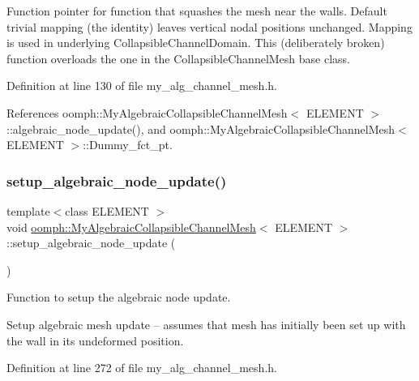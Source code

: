 Function pointer for function that squashes the mesh near the walls. Default trivial mapping (the identity) leaves vertical nodal positions unchanged. Mapping is used in underlying Collapsible\+Channel\+Domain. This (deliberately broken) function overloads the one in the Collapsible\+Channel\+Mesh base class. 



Definition at line 130 of file my\+\_\+alg\+\_\+channel\+\_\+mesh.\+h.



References oomph\+::\+My\+Algebraic\+Collapsible\+Channel\+Mesh$<$ E\+L\+E\+M\+E\+N\+T $>$\+::algebraic\+\_\+node\+\_\+update(), and oomph\+::\+My\+Algebraic\+Collapsible\+Channel\+Mesh$<$ E\+L\+E\+M\+E\+N\+T $>$\+::\+Dummy\+\_\+fct\+\_\+pt.

\mbox{\label{classoomph_1_1MyAlgebraicCollapsibleChannelMesh_ad5ae1032e856e8997cc138b84a089452}} 
\subsubsection{\texorpdfstring{setup\+\_\+algebraic\+\_\+node\+\_\+update()}{setup\_algebraic\_node\_update()}}
{\footnotesize\ttfamily template$<$class E\+L\+E\+M\+E\+NT $>$ \\
void \hyperlink{classoomph_1_1MyAlgebraicCollapsibleChannelMesh}{oomph\+::\+My\+Algebraic\+Collapsible\+Channel\+Mesh}$<$ E\+L\+E\+M\+E\+NT $>$\+::setup\+\_\+algebraic\+\_\+node\+\_\+update (\begin{DoxyParamCaption}{ }\end{DoxyParamCaption})\hspace{0.3cm}{\ttfamily [protected]}}



Function to setup the algebraic node update. 

Setup algebraic mesh update -- assumes that mesh has initially been set up with the wall in its undeformed position. 

Definition at line 272 of file my\+\_\+alg\+\_\+channel\+\_\+mesh.\+h.



